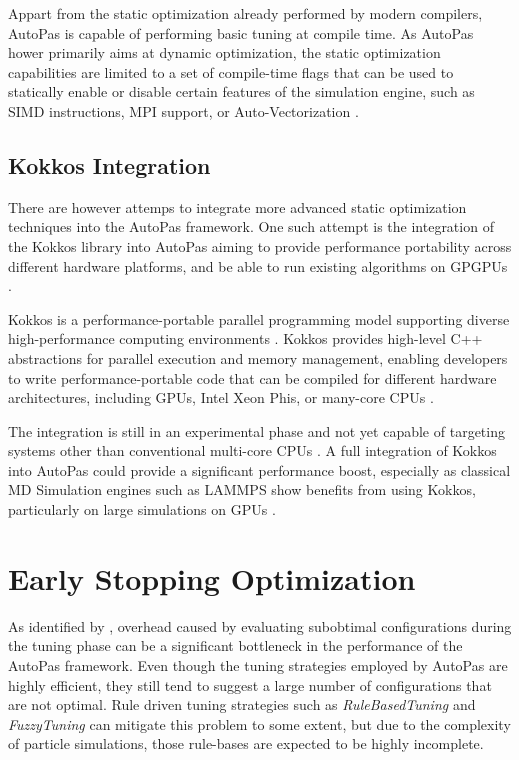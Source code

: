 \documentclass[conference]{IEEEtran}
\begin{document}
Appart from the static optimization already performed by modern compilers, AutoPas is capable of performing basic tuning at compile time. As AutoPas hower primarily aims at dynamic optimization, the static optimization capabilities are limited to a set of compile-time flags that can be used to statically enable or disable certain features of the simulation engine, such as SIMD instructions, MPI support, or Auto-Vectorization \cite{Gratl2019AutoPas}.

\subsection{Kokkos Integration}

There are however attemps to integrate more advanced static optimization techniques into the AutoPas framework. One such attempt is the integration of the Kokkos library into AutoPas aiming to provide performance portability across different hardware platforms, and be able to run existing algorithms on GPGPUs \cite{Gärtner_KokkosInAutoPas.pdf}. 

Kokkos is a performance-portable parallel programming model supporting diverse high-performance computing environments \cite{CARTEREDWARDS20143202}. Kokkos provides high-level C++ abstractions for parallel execution and memory management, enabling developers to write performance-portable code that can be compiled for different hardware architectures, including GPUs, Intel Xeon Phis, or many-core CPUs \cite{lammps_kokkos}.

The integration is still in an experimental phase and not yet capable of targeting systems other than conventional multi-core CPUs \cite{Gärtner_KokkosInAutoPas.pdf}. A full integration of Kokkos into AutoPas could provide a significant performance boost, especially as classical MD Simulation engines such as LAMMPS show benefits from using Kokkos, particularly on large simulations on GPUs \cite{lammps_kokkos}.

\newpage
\newpage

\section{Early Stopping Optimization}

As identified by \cite{autopas_issue673}\cite{endreport.pdf}\cite{Manuel_Lerchner_Thesis.pdf}, overhead caused by evaluating subobtimal configurations during the tuning phase can be a significant bottleneck in the performance of the AutoPas framework. Even though the tuning strategies employed by AutoPas are highly efficient, they still tend to suggest a large number of configurations that are not optimal. Rule driven tuning strategies such as \textit{RuleBasedTuning} and \textit{FuzzyTuning} can mitigate this problem to some extent, but due to the complexity of particle simulations, those rule-bases are expected to be highly incomplete.
\end{document}
